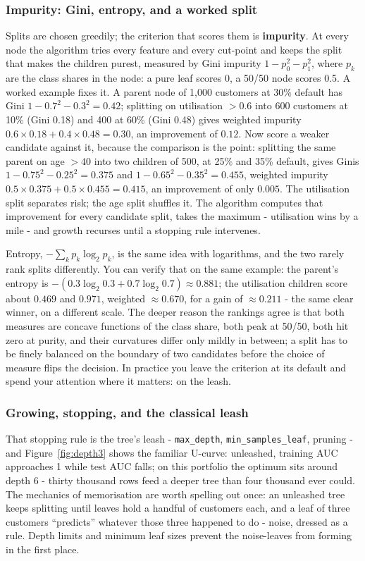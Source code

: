 \documentclass[11pt,a4paper]{article}
\begin{document}
\subsubsection{Impurity: Gini, entropy, and a worked split}
Splits are chosen greedily; the criterion that scores them is
\textbf{impurity}. At every node the algorithm tries every feature and
every cut-point and keeps the split that makes the children purest,
measured by Gini impurity $1 - p_0^2 - p_1^2$, where $p_k$ are the
class shares in the node: a pure leaf scores 0, a 50/50 node scores
0.5. A worked example fixes it. A parent node of 1{,}000
customers at 30\% default has Gini $1 - 0.7^2 - 0.3^2 = 0.42$; splitting on
utilisation $> 0.6$ into 600 customers at 10\% (Gini 0.18) and 400 at 60\%
(Gini 0.48) gives weighted impurity $0.6 \times 0.18 + 0.4 \times 0.48 =
0.30$, an improvement of $0.12$. Now score a weaker candidate against
it, because the comparison is the point: splitting the same parent on
age $> 40$ into two children of 500, at 25\% and 35\% default, gives
Ginis $1 - 0.75^2 - 0.25^2 = 0.375$ and $1 - 0.65^2 - 0.35^2 = 0.455$,
weighted impurity $0.5 \times 0.375 + 0.5 \times 0.455 = 0.415$, an
improvement of only $0.005$. The utilisation split separates risk; the
age split shuffles it. The algorithm computes that improvement
for every candidate split, takes the maximum - utilisation wins by a
mile - and growth recurses until a stopping rule intervenes.

Entropy, $-\sum_k p_k \log_2 p_k$, is the same idea with logarithms,
and the two rarely rank splits differently. You can verify that on the
same example: the parent's entropy is
$-(0.3 \log_2 0.3 + 0.7 \log_2 0.7) \approx 0.881$; the utilisation
children score about $0.469$ and $0.971$, weighted $\approx 0.670$,
for a gain of $\approx 0.211$ - the same clear winner, on a different
scale. The deeper reason the rankings agree is that both measures are
concave functions of the class share, both peak at 50/50, both hit
zero at purity, and their curvatures differ only mildly in between; a
split has to be finely balanced on the boundary of two candidates
before the choice of measure flips the decision. In practice you leave
the criterion at its default and spend your attention where it
matters: on the leash.

\subsubsection{Growing, stopping, and the classical leash}
That stopping rule is the tree's leash -
\texttt{max\_depth}, \texttt{min\_samples\_leaf}, pruning - and
Figure~\ref{fig:depth3} shows the familiar U-curve: unleashed, training AUC
approaches 1 while test AUC falls; on this portfolio the optimum sits around
depth 6 - thirty thousand rows feed a deeper tree than four thousand
ever could. The mechanics of memorisation are worth spelling out once:
an unleashed tree keeps splitting until leaves hold a handful of
customers each, and a leaf of three customers ``predicts'' whatever
those three happened to do - noise, dressed as a rule. Depth limits
and minimum leaf sizes prevent the noise-leaves from forming in the
first place.
\end{document}
